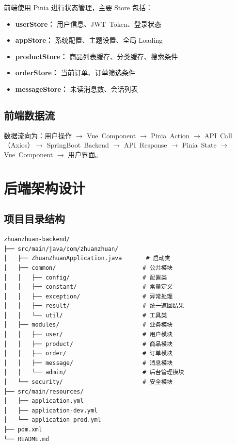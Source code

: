 \documentclass[12pt,a4paper,UTF8]{ctexart}
\begin{document}
前端使用 Pinia 进行状态管理，主要 Store 包括：

\begin{itemize}[itemsep=3pt]
    \item \textbf{userStore：} 用户信息、JWT~Token、登录状态
    \item \textbf{appStore：} 系统配置、主题设置、全局 Loading
    \item \textbf{productStore：} 商品列表缓存、分类缓存、搜索条件
    \item \textbf{orderStore：} 当前订单、订单筛选条件
    \item \textbf{messageStore：} 未读消息数、会话列表
\end{itemize}

\subsection{前端数据流}

数据流向为：用户操作 $\rightarrow$ Vue~Component $\rightarrow$ Pinia~Action $\rightarrow$ API~Call（Axios）$\rightarrow$ SpringBoot~Backend $\rightarrow$ API~Response $\rightarrow$ Pinia~State $\rightarrow$ Vue~Component $\rightarrow$ 用户界面。

\section{后端架构设计}

\subsection{项目目录结构}

\begin{lstlisting}[language={},breaklines=true]
zhuanzhuan-backend/
├── src/main/java/com/zhuanzhuan/
│   ├── ZhuanZhuanApplication.java       # 启动类
│   ├── common/                         # 公共模块
│   │   ├── config/                     # 配置类
│   │   ├── constant/                   # 常量定义
│   │   ├── exception/                  # 异常处理
│   │   ├── result/                     # 统一返回结果
│   │   └── util/                       # 工具类
│   ├── modules/                        # 业务模块
│   │   ├── user/                       # 用户模块
│   │   ├── product/                    # 商品模块
│   │   ├── order/                      # 订单模块
│   │   ├── message/                    # 消息模块
│   │   └── admin/                      # 后台管理模块
│   └── security/                       # 安全模块
├── src/main/resources/
│   ├── application.yml
│   ├── application-dev.yml
│   └── application-prod.yml
├── pom.xml
└── README.md
\end{lstlisting}
\end{document}
